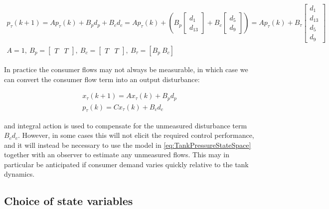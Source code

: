 \begin{equation}\label{eq:TankPressureStateSpace}
	\begin{gathered}
				p_\tau(k+1) = A p_\tau(k) + B_pd_p + B_cd_c
				= A p_\tau(k) + \left(B_p \begin{bmatrix}d_1 \\ d_{13}\end{bmatrix} 
				+ B_c\begin{bmatrix}d_5 \\ d_9\end{bmatrix}\right) = Ap_\tau(k) + B_\tau \begin{bmatrix} d_1 \\ d_{13} \\ d_5 \\ d_9 \end{bmatrix} \\      
				A = 1, \ B_p = \begin{bmatrix}T & T \end{bmatrix}, \ B_c = \begin{bmatrix}T & T\end{bmatrix}, \ B_\tau = \left[B_p \ B_c \right]
	\end{gathered}
\end{equation}

In practice the consumer flows may not always be measurable, in which case we can convert the consumer flow term into an output disturbance:

\begin{equation}\label{eq:TankPressureStateSpaceReduced}
	\begin{gathered}
		x_\tau(k+1) = A x_\tau(k) + B_pd_p \\
		p_\tau(k) = Cx_\tau(k) + B_cd_c
	\end{gathered}
\end{equation}

and integral action is used to compensate for the unmeasured disturbance term $B_c d_c$. However, in some cases this will not elicit the required control performance, and it will instead be necessary to use the model in \cref{eq:TankPressureStateSpace} together with an observer to estimate any unmeasured flows. This may in particular be anticipated if consumer demand varies quickly relative to the tank dynamics.

\subsection{Choice of state variables}

